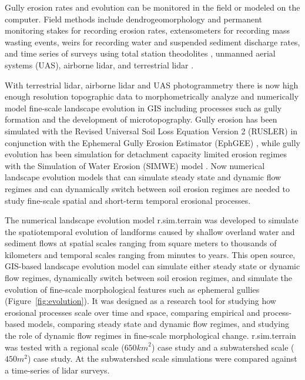 \documentclass[esurf, manuscript]{copernicus}
\begin{document}
Gully erosion rates and evolution
can be monitored in the field 
or modeled on the computer. 
Field methods include
dendrogeomorphology \citep{Malik2008} and 
permanent monitoring stakes for recording erosion rates, 
extensometers for recording mass wasting events, 
weirs for recording water and suspended sediment discharge rates, 
and time series of surveys using 
total station theodolites \citep{Thomas2004},
unmanned aerial systems (UAS),
airborne lidar, and terrestrial lidar \citep{Starek2011,Bechet2016}.

With terrestrial lidar, airborne lidar and 
UAS photogrammetry
there is now high enough resolution topographic data 
to morphometrically analyze and 
numerically model fine-scale landscape evolution in GIS
including processes such as gully formation 
and the development of microtopography. 
Gully erosion has been simulated with 
the Revised Universal Soil Loss Equation Version 2 (RUSLER)
in conjunction with the Ephemeral Gully Erosion Estimator (EphGEE)
\citep{Dabney2014},
while gully evolution
has been simulation for detachment capacity limited erosion regimes
with the Simulation of Water Erosion (SIMWE) model
\citep{Koco2011, Mitasova2013}. 
Now numerical landscape evolution models 
that can simulate 
steady state and dynamic flow regimes
and can dynamically switch between soil erosion regimes 
are needed to study 
fine-scale spatial and short-term temporal erosional processes.

The numerical landscape evolution model 
\lowercase{r.sim.terrain} was developed to 
simulate the spatiotemporal evolution of landforms
caused by shallow overland water and sediment flows
at spatial scales ranging from
square meters to thousands of kilometers
and temporal scales ranging from minutes to years. 
This open source, GIS-based landscape evolution model can
simulate either steady state or dynamic flow regimes, 
dynamically switch between soil erosion regimes, and
simulate the evolution of fine-scale morphological features 
such as ephemeral gullies
(Figure~\ref{fig:evolution}).
It was designed as a research tool for
studying how erosional processes scale over time and space,
comparing empirical and process-based models, 
comparing steady state and dynamic flow regimes, and
studying the role of dynamic flow regimes 
in fine-scale morphological change. 
\lowercase{r.sim.terrain} was tested with 
a regional scale ($650 \unit{km}^{2}$) case study
and a subwatershed scale ($450 \unit{m}^{2}$) case study. 
At the subwatershed scale simulations were compared against 
a time-series of lidar surveys.
\end{document}

